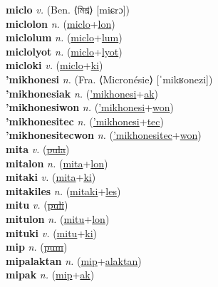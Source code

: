 \textbf{miclo} \textit{v.} (Ben. ⟨মিশ্র⟩ [miɕrɔ])
 \label{miclo} \\
\textbf{miclolon} \textit{n.} (\hyperref[miclo]{miclo}+\hyperref[lon]{lon})
 \label{miclolon} \\
\textbf{miclolum} \textit{n.} (\hyperref[miclo]{miclo}+\hyperref[lum]{lum})
 \label{miclolum} \\
\textbf{miclolyot} \textit{n.} (\hyperref[miclo]{miclo}+\hyperref[lyot]{lyot})
 \label{miclolyot} \\
\textbf{micloki} \textit{v.} (\hyperref[miclo]{miclo}+\hyperref[ki]{ki})
 \label{micloki} \\
\textbf{'mikhonesi} \textit{n.} (Fra. ⟨Micronésie⟩ [ˈmikʁonezi])
 \label{'mikhonesi} \\
\textbf{'mikhonesiak} \textit{n.} (\hyperref['mikhonesi]{'mikhonesi}+\hyperref[ak]{ak})
 \label{'mikhonesiak} \\
\textbf{'mikhonesiwon} \textit{n.} (\hyperref['mikhonesi]{'mikhonesi}+\hyperref[won]{won})
 \label{'mikhonesiwon} \\
\textbf{'mikhonesitec} \textit{n.} (\hyperref['mikhonesi]{'mikhonesi}+\hyperref[tec]{tec})
 \label{'mikhonesitec} \\
\textbf{'mikhonesitecwon} \textit{n.} (\hyperref['mikhonesitec]{'mikhonesitec}+\hyperref[won]{won})
 \label{'mikhonesitecwon} \\
\textbf{mita} \textit{v.} (\hyperref[pula]{\sout{pula}})
 \label{mita} \\
\textbf{mitalon} \textit{n.} (\hyperref[mita]{mita}+\hyperref[lon]{lon})
 \label{mitalon} \\
\textbf{mitaki} \textit{v.} (\hyperref[mita]{mita}+\hyperref[ki]{ki})
 \label{mitaki} \\
\textbf{mitakiles} \textit{n.} (\hyperref[mitaki]{mitaki}+\hyperref[les]{les})
 \label{mitakiles} \\
\textbf{mitu} \textit{v.} (\hyperref[puli]{\sout{puli}})
 \label{mitu} \\
\textbf{mitulon} \textit{n.} (\hyperref[mitu]{mitu}+\hyperref[lon]{lon})
 \label{mitulon} \\
\textbf{mituki} \textit{v.} (\hyperref[mitu]{mitu}+\hyperref[ki]{ki})
 \label{mituki} \\
\textbf{mip} \textit{n.} (\hyperref[pum]{\sout{pum}})
 \label{mip} \\
\textbf{mipalaktan} \textit{n.} (\hyperref[mip]{mip}+\hyperref[alaktan]{alaktan})
 \label{mipalaktan} \\
\textbf{mipak} \textit{n.} (\hyperref[mip]{mip}+\hyperref[ak]{ak})

